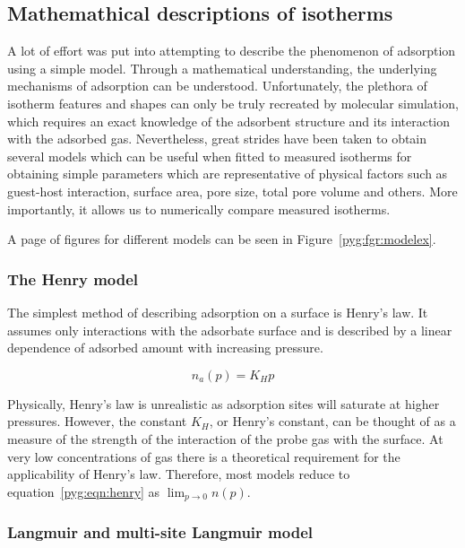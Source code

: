 \subsection{Mathemathical descriptions of isotherms}

A lot of effort was put into attempting to describe 
the phenomenon of adsorption using a simple model.
Through a mathematical understanding, the underlying 
mechanisms of adsorption can be understood.
Unfortunately, the plethora of isotherm 
features and shapes can only be truly recreated
by molecular simulation, which requires an exact
knowledge of the adsorbent structure and its interaction
with the adsorbed gas.
Nevertheless, great strides have been taken to
obtain several models which can be useful
when fitted to measured isotherms
for obtaining simple parameters which are 
representative of physical factors such as 
guest-host interaction, surface area, pore size,
total pore volume and others.
More importantly, it allows us to numerically 
compare measured isotherms. 

A page of figures for different models can be seen in 
Figure~\ref{pyg:fgr:modelex}.

\subsubsection{The Henry model}\label{pyg:models:henry}

The simplest method of describing adsorption on a 
surface is Henry’s law. It assumes only interactions
with the adsorbate surface and is described by a 
linear dependence of adsorbed amount with
increasing pressure.

\begin{equation}\label{pyg:eqn:henry}
    n_a(p) = K_H p
\end{equation}

Physically, Henry's law is unrealistic as adsorption sites
will saturate at higher pressures. However, the constant \(K_H\),
or Henry’s constant, can be thought of as a measure of the strength
of the interaction of the probe gas with the surface. At very 
low concentrations of gas there is a 
theoretical requirement for the applicability of Henry's law.
Therefore, most models reduce to equation~\ref{pyg:eqn:henry}
as \(\lim_{p \to 0} n(p)\).

\subsubsection{Langmuir and multi-site Langmuir model}\label{pyg:models:langmuir}

